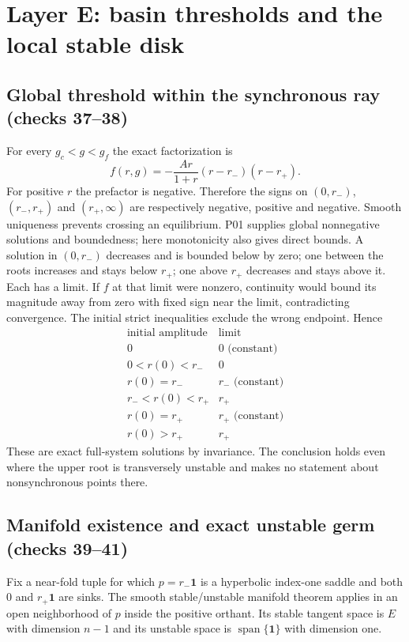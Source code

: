 \documentclass[11pt]{article}
\newcommand{\one}{\mathbf1}
\begin{document}
\section{Layer E: basin thresholds and the local stable disk}
\label{sec:E}
\subsection{Global threshold within the synchronous ray (checks 37--38)}
For every $g_c<g<g_f$ the exact factorization is
\[
 f(r,g)=-\frac{Ar}{1+r}(r-r_-)(r-r_+).
\]
For positive $r$ the prefactor is negative. Therefore the signs on
$(0,r_-)$, $(r_-,r_+)$ and $(r_+,\infty)$ are respectively negative,
positive and negative. Smooth uniqueness prevents crossing an equilibrium.
P01 supplies global nonnegative solutions and boundedness; here monotonicity
also gives direct bounds. A solution in $(0,r_-)$ decreases and is bounded
below by zero; one between the roots increases and stays below $r_+$; one
above $r_+$ decreases and stays above it. Each has a limit. If $f$ at that
limit were nonzero, continuity would bound its magnitude away from zero
with fixed sign near the limit, contradicting convergence. The initial
strict inequalities exclude the wrong endpoint. Hence
\[
\begin{array}{c|c}
\text{initial amplitude}&\text{limit}\\\hline
0&0\text{ (constant)}\\
0<r(0)<r_-&0\\
r(0)=r_-&r_-\text{ (constant)}\\
r_-<r(0)<r_+&r_+\\
r(0)=r_+&r_+\text{ (constant)}\\
r(0)>r_+&r_+
\end{array}
\]
These are exact full-system solutions by invariance. The conclusion holds
even where the upper root is transversely unstable and makes no statement
about nonsynchronous points there.

\subsection{Manifold existence and exact unstable germ (checks 39--41)}
Fix a near-fold tuple for which $p=r_-\one$ is a hyperbolic index-one saddle
and both $0$ and $r_+\one$ are sinks. The smooth stable/unstable manifold
theorem applies in an open neighborhood of $p$ inside the positive orthant.
Its stable tangent space is $E$ with dimension $n-1$ and its unstable space
is $\operatorname{span}\{\one\}$ with dimension one.
\end{document}
